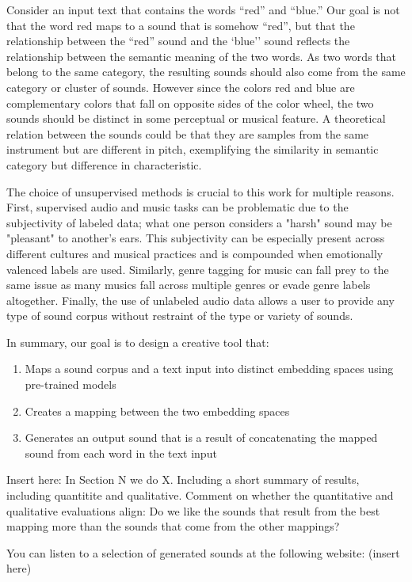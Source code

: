 \documentclass[twoside,a4paper]{article}
\begin{document}
Consider an input text that contains the words ``red'' and ``blue.'' Our goal is not that the word red maps to a  sound that is somehow ``red'', but that the relationship between the ``red'' sound and the `blue'' sound reflects the relationship between the semantic meaning of the two words. As two words that belong to the same category, the resulting sounds should also come from the same category or cluster of sounds. However since the colors red and blue are complementary colors that fall on opposite sides of the color wheel, the two sounds should be distinct in some perceptual or musical feature. A theoretical relation between the sounds could be that they are samples from the same instrument but are different in pitch, exemplifying the similarity in semantic category but difference in characteristic.

The choice of unsupervised methods is crucial to this work for multiple reasons. First, supervised audio and music tasks can be problematic due to the subjectivity of labeled data; what one person considers a "harsh" sound may be "pleasant" to another's ears. This subjectivity can be especially present across different cultures and musical practices and is compounded when emotionally valenced labels are used. Similarly, genre tagging for music can fall prey to the same issue as many musics fall across multiple genres or evade genre labels altogether. Finally, the use of unlabeled audio data allows a user to provide any type of sound corpus without restraint of the type or variety of sounds.

In summary, our goal is to design a creative tool that:
\begin{enumerate}
    \item Maps a sound corpus and a text input into distinct embedding spaces using pre-trained models
    \item Creates a mapping between the two embedding spaces
    \item Generates an output sound that is a result of concatenating the mapped sound from each word in the text input
\end{enumerate}

Insert here: In Section N we do X. Including a short summary of results, including quantitite and qualitative. Comment on whether the quantitative and qualitative evaluations align: Do we like the sounds that result from the best mapping more than the sounds that come from the other mappings? 

You can listen to a selection of generated sounds at the following website: (insert here)
\end{document}

